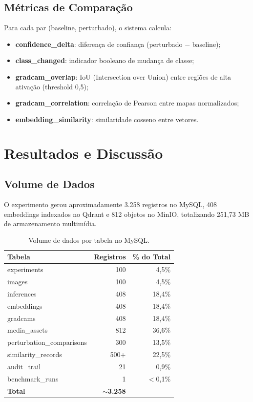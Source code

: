 \documentclass[12pt,a4paper,twoside]{article}
\begin{document}
\subsection{Métricas de Comparação}

Para cada par (baseline, perturbado), o sistema calcula:

\begin{itemize}
    \item \textbf{confidence\_delta}: diferença de confiança (perturbado $-$ baseline);
    \item \textbf{class\_changed}: indicador booleano de mudança de classe;
    \item \textbf{gradcam\_overlap}: IoU (Intersection over Union) entre regiões de alta ativação (threshold 0,5);
    \item \textbf{gradcam\_correlation}: correlação de Pearson entre mapas normalizados;
    \item \textbf{embedding\_similarity}: similaridade cosseno entre vetores.
\end{itemize}

\section{Resultados e Discussão}
\label{sec:resultados}

\subsection{Volume de Dados}

O experimento gerou aproximadamente 3.258 registros no MySQL, 408 embeddings indexados no Qdrant e 812 objetos no MinIO, totalizando 251,73 MB de armazenamento multimídia.

\begin{table}[H]
\centering
\caption{Volume de dados por tabela no MySQL.}
\label{tab:volume}
\begin{tabular}{@{}lrr@{}}
\toprule
\textbf{Tabela} & \textbf{Registros} & \textbf{\% do Total} \\
\midrule
experiments & 100 & 4,5\% \\
images & 100 & 4,5\% \\
inferences & 408 & 18,4\% \\
embeddings & 408 & 18,4\% \\
gradcams & 408 & 18,4\% \\
media\_assets & 812 & 36,6\% \\
perturbation\_comparisons & 300 & 13,5\% \\
similarity\_records & 500+ & 22,5\% \\
audit\_trail & 21 & 0,9\% \\
benchmark\_runs & 1 & $<$0,1\% \\
\midrule
\textbf{Total} & \textbf{$\sim$3.258} & --- \\
\bottomrule
\end{tabular}
\end{table}
\end{document}
